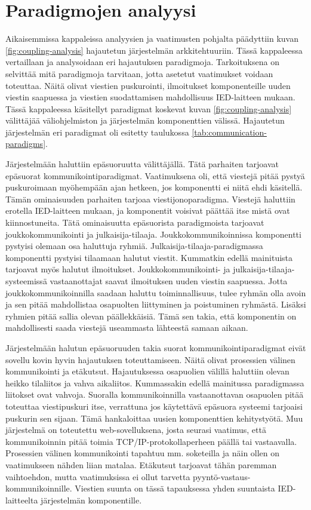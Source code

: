 \section{Paradigmojen analyysi}
Aikaisemmissa kappaleissa analyysien ja vaatimusten pohjalta päädyttiin kuvan \ref{fig:coupling-analysis} hajautetun järjestelmän arkkitehtuuriin. Tässä kappaleessa vertaillaan ja analysoidaan eri hajautuksen paradigmoja. Tarkoituksena on selvittää mitä paradigmoja tarvitaan, jotta asetetut vaatimukset voidaan toteuttaa. Näitä olivat viestien puskurointi, ilmoitukset komponenteille uuden viestin saapuessa ja viestien suodattamisen mahdollisuus IED-laitteen mukaan. Tässä kappaleessa käsitellyt paradigmat koskevat kuvan \ref{fig:coupling-analysis} välittäjää väliohjelmiston ja järjestelmän komponenttien välissä. Hajautetun järjestelmän eri paradigmat oli esitetty taulukossa \ref{tab:communication-paradigms}.

Järjestelmään haluttiin epäsuoruutta välittäjällä. Tätä parhaiten tarjoavat epäsuorat kommunikointiparadigmat. Vaatimuksena oli, että viestejä pitää pystyä puskuroimaan myöhempään ajan hetkeen, jos komponentti ei niitä ehdi käsitellä. Tämän ominaisuuden parhaiten tarjoaa viestijonoparadigma. Viestejä haluttiin erotella IED-laitteen mukaan, ja komponentit voisivat päättää itse mistä ovat kiinnostuneita. Tätä ominaisuutta epäsuorista paradigmoista tarjoavat joukkokommunikointi ja julkaisija-tilaaja. Joukkokommunikoinnissa komponentti pystyisi olemaan osa haluttuja ryhmiä. Julkaisija-tilaaja-paradigmassa komponentti pystyisi tilaamaan halutut viestit. Kummatkin edellä mainituista tarjoavat myös halutut ilmoitukset. Joukkokommunikointi- ja julkaisija-tilaaja-systeemissä vastaanottajat saavat ilmoituksen uuden viestin saapuessa. Jotta joukkokommunikoinnilla saadaan haluttu toiminnallisuus, tulee ryhmän olla avoin ja sen pitää mahdollistaa osapuolten liittyminen ja poistuminen ryhmästä. Lisäksi ryhmien pitää sallia olevan päällekkäisiä. Tämä sen takia, että komponentin on mahdollisesti saada viestejä useammasta lähteestä samaan aikaan.

Järjestelmään halutun epäsuoruuden takia suorat kommunikointiparadigmat eivät sovellu kovin hyvin hajautuksen toteuttamiseen. Näitä olivat prosessien välinen kommunikointi ja etäkutsut. Hajautuksessa osapuolien välillä haluttiin olevan heikko tilaliitos ja vahva aikaliitos. Kummassakin edellä mainitussa paradigmassa liitokset ovat vahvoja. Suoralla kommunikoinnilla vastaanottavan osapuolen pitää toteuttaa viestipuskuri itse, verrattuna jos käytettävä epäsuora systeemi tarjoaisi puskurin sen sijaan. Tämä hankaloittaa uusien komponenttien kehitystyötä. Muu järjestelmä on toteutettu web-sovelluksena, josta seurasi vaatimus, että kommunikoinnin pitää toimia TCP/IP-protokollaperheen päällä tai vastaavalla. Prosessien välinen kommunikointi tapahtuu mm. soketeilla ja näin ollen on vaatimukseen nähden liian matalaa. Etäkutsut tarjoavat tähän paremman vaihtoehdon, mutta vaatimuksissa ei ollut tarvetta pyyntö-vastaus-kommunikoinnille. Viestien suunta on tässä tapauksessa yhden suuntaista IED-laitteelta järjestelmän komponentille.

